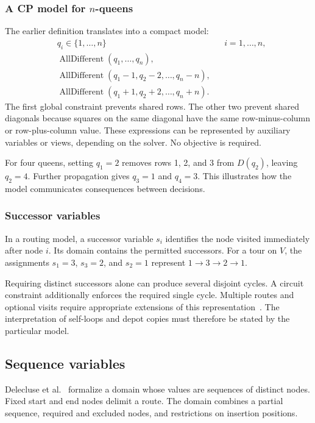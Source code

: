 \subsubsection{A CP model for $n$-queens}

The earlier definition translates into a compact model:
\begin{align*}
 &q_i\in\{1,\ldots,n\} && i=1,\ldots,n,\\
 &\operatorname{AllDifferent}(q_1,\ldots,q_n),\\
 &\operatorname{AllDifferent}(q_1-1,q_2-2,\ldots,q_n-n),\\
 &\operatorname{AllDifferent}(q_1+1,q_2+2,\ldots,q_n+n).
\end{align*}
The first global constraint prevents shared rows. The other two prevent shared
diagonals because squares on the same diagonal have the same row-minus-column
or row-plus-column value. These expressions can be represented by auxiliary
variables or views, depending on the solver. No objective is required.

For four queens, setting $q_1=2$ removes rows 1, 2, and 3 from $D(q_2)$,
leaving $q_2=4$. Further propagation gives $q_3=1$ and $q_4=3$.
This illustrates how the model communicates consequences between decisions.

\subsubsection{Successor variables}

In a routing model, a successor variable $s_i$ identifies the node visited
immediately after node $i$. Its domain contains the permitted successors.
For a tour on $V$, the assignments $s_1=3$, $s_3=2$, and $s_2=1$ represent
$1\rightarrow3\rightarrow2\rightarrow1$.

Requiring distinct successors alone can produce several disjoint cycles.
A circuit constraint additionally enforces the required single cycle.
Multiple routes and optional visits require appropriate extensions of this
representation~\cite{vismara2018circuit}. The interpretation of self-loops and
depot copies must therefore be stated by the particular model.

\subsection{Sequence variables}

Delecluse et al.~\cite{delecluse2025sequence} formalize a domain whose values
are sequences of distinct nodes. Fixed start and end nodes delimit a route.
The domain combines a partial sequence, required and excluded nodes, and
restrictions on insertion positions.

